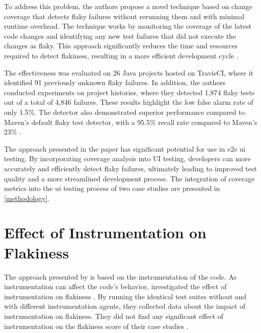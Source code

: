 To address this problem, the authors propose a novel technique based on change coverage that detects flaky failures without rerunning them and with minimal runtime overhead.
The technique works by monitoring the coverage of the latest code changes and identifying any new test failures that did not execute the changes as flaky.
This approach significantly reduces the time and resources required to detect flakiness, resulting in a more efficient development cycle \autocite{bell_deflaker_2018}.

The effectiveness was evaluated on 26 Java projects hosted on TravisCI, where it identified 91 previously unknown flaky failures.
In addition, the authors conducted experiments on project histories, where they detected 1,874 flaky tests out of a total of 4,846 failures.
These results highlight the low false alarm rate of only 1.5\%.
The detector also demonstrated superior performance compared to Maven's default flaky test detector, with a 95.5\% recall rate compared to Maven's 23\% \autocite{bell_deflaker_2018}.

The approach presented in the  paper has significant potential for use in \ac{e2e} \ac{ui} testing.
By incorporating coverage analysis into UI testing, developers can more accurately and efficiently detect flaky failures, ultimately leading to improved test quality and a more streamlined development process.
The integration of coverage metrics into the \ac{ui} testing process of two case studies are presented in \cref{methodology}.

\section{Effect of Instrumentation on Flakiness}
The approach presented by \citeauthor*{bell_deflaker_2018} is based on the instrumentation of the code.
As instrumentation can affect the code's behavior, \citeauthor*{rasheed_effect_2023} investigated the effect of instrumentation on flakiness \autocite{rasheed_effect_2023}.
By running the identical test suites without and with different instrumentation agents, they collected data about the impact of instrumentation on flakiness.
They did not find any significant effect of instrumentation on the flakiness score of their case studies \autocite{rasheed_effect_2023}.


